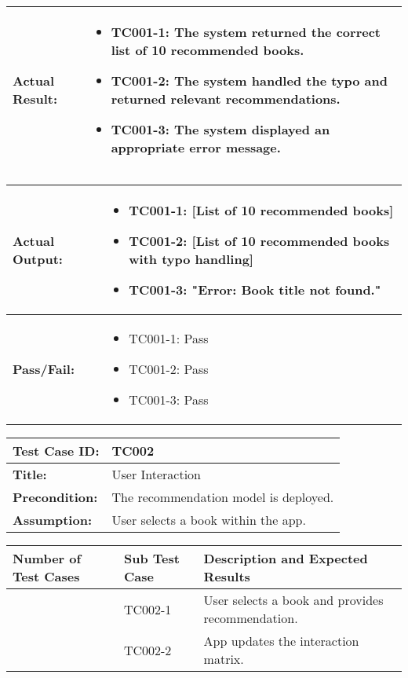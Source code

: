 \documentclass{article}
\begin{document}
\noindent
\begin{tabularx}{\textwidth}{|>{\raggedright\arraybackslash}p{4cm}|X|}
    \hline
    \textbf{Actual Result:} & 
    \begin{itemize}
        \item TC001-1: The system returned the correct list of 10 recommended books.
        \item TC001-2: The system handled the typo and returned relevant recommendations.
        \item TC001-3: The system displayed an appropriate error message.
    \end{itemize}
    \\ \hline
\end{tabularx}

\noindent
\begin{tabularx}{\textwidth}{|>{\raggedright\arraybackslash}p{4cm}|X|}
    \hline
    \textbf{Actual Output:} & 
    \begin{itemize}
        \item TC001-1: [List of 10 recommended books]
        \item TC001-2: [List of 10 recommended books with typo handling]
        \item TC001-3: "Error: Book title not found."
    \end{itemize}
    \\ \hline
    \textbf{Pass/Fail:} & 
    \begin{itemize}
        \item TC001-1: Pass
        \item TC001-2: Pass
        \item TC001-3: Pass
    \end{itemize}
    \\ \hline
\end{tabularx}

\noindent
\begin{tabularx}{\textwidth}{|>{\raggedright\arraybackslash}p{4cm}|X|}
    \hline
    \textbf{Test Case ID:} & TC002 \\ \hline
    \textbf{Title:} & User Interaction \\ \hline
    \textbf{Precondition:} & The recommendation model is deployed. \\ \hline
    \textbf{Assumption:} & User selects a book within the app. \\ \hline
\end{tabularx}

\noindent
\begin{tabularx}{\textwidth}{|>{\centering\arraybackslash}p{3cm}|>{\centering\arraybackslash}p{3cm}|X|}
    \hline
    \textbf{Number of Test Cases} & \textbf{Sub Test Case} & \textbf{Description and Expected Results} \\ \hline
    1 & TC002-1 & User selects a book and provides recommendation. \\ \hline
    2 & TC002-2 & App updates the interaction matrix. \\ \hline
\end{tabularx}
\end{document}
